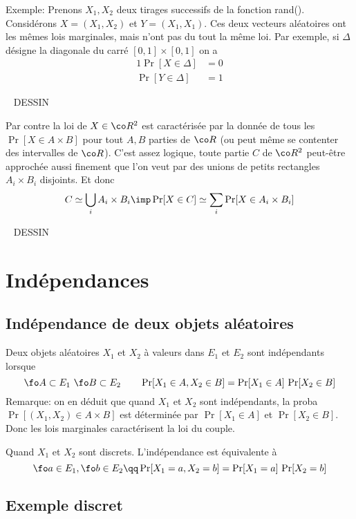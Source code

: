 \documentclass{article}
\def\dessin{\ \linebreak \vspace{0.5cm}  \linebreak  DESSIN  \vspace{1cm} \ \linebreak   }
\begin{document}
Exemple:  Prenons $X_1,X_2$  deux tirages successifs de la fonction rand().  Considérons $X=(X_1,X_2)$ et $Y=(X_1,X_1)$. Ces deux vecteurs aléatoires ont les mêmes lois marginales, mais n'ont pas du tout la même loi. Par exemple, si $\Delta$ désigne la diagonale du carré $[0,1] \times [0,1]$ on a
\begin{alignat*}{1}
\Pr[ X \in \Delta  ] &= 0\\ 
\Pr[ Y \in \Delta  ] &= 1 
\end{alignat*}
 
\dessin


Par contre la loi de $X\in \co R^2$ est caractérisée par la donnée de tous les $\Pr[X \in  A \times  B]$ pour tout $A,B$ parties de $\co R$ (ou peut même se contenter des intervalles de $\co R$).  C'est assez logique, toute partie $C$ de $\co R^2$ peut-être approchée aussi finement que l'on veut par des unions de petits rectangles $A_i\times B_i$  disjoints. Et donc 
$$
 C \simeq  \bigcup_i  A_i\times B_i   \imp  \Pr[X\in C] \simeq \sum_i \Pr[ X\in A_i \times B_i  ]
$$

\dessin





\section{Indépendances}

\subsection{Indépendance de deux objets aléatoires}

Deux objets aléatoires $X_1$ et $X_2$ à valeurs dans $E_1$ et $E_2$ sont indépendants lorsque 
$$
\fo A\subset E_1\ \fo B\subset E_2 \qquad \Pr[ X_1 \in A  ,  X_2 \in B] = \Pr[X_1\in A] \, \Pr[X_2\in B]
$$
Remarque: on en déduit que quand $X_1$ et $X_2$ sont indépendants,  la proba $\Pr[(X_1,X_2) \in A\times B] $ est déterminée par  $\Pr[X_1\in A]$ et $ \Pr[X_2\in B]$. Donc  les lois marginales  caractérisent la loi du couple. 

Quand $X_1$ et $X_2$ sont discrets. L'indépendance est équivalente à
$$
\fo a \in E_1, \fo b\in E_2 \qq \Pr[X_1=a, X_2=b] = \Pr[X_1=a]\, \Pr[X_2=b]
$$

\subsection{Exemple discret}
\end{document}
